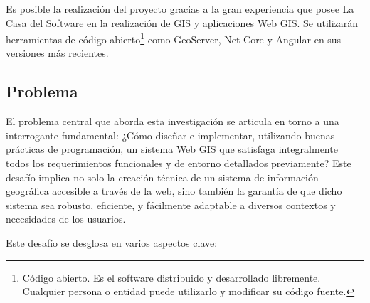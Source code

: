 Es posible la realización del proyecto gracias a la gran experiencia que
posee La Casa del Software en la realización de GIS y aplicaciones Web
GIS. Se utilizarán herramientas de código abierto\footnote{Código
  abierto. Es el software distribuido y desarrollado libremente.
  Cualquier persona o entidad puede utilizarlo y modificar su código
  fuente.} como GeoServer, Net Core y Angular en sus versiones más
recientes.


\subsection{Problema}\label{problema}

El problema central que aborda esta investigación se articula en torno a
una interrogante fundamental: ¿Cómo diseñar e implementar, utilizando
buenas prácticas de programación, un sistema Web GIS que satisfaga
integralmente todos los requerimientos funcionales y de entorno
detallados previamente? Este desafío implica no solo la creación técnica
de un sistema de información geográfica accesible a través de la web,
sino también la garantía de que dicho sistema sea robusto, eficiente, y
fácilmente adaptable a diversos contextos y necesidades de los usuarios.

Este desafío se desglosa en varios aspectos clave:

